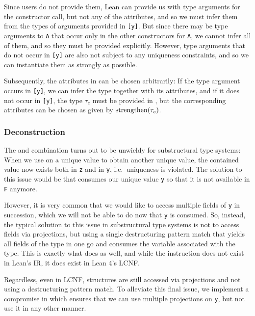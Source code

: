 Since users do not provide them, Lean can provide us with type arguments \icode{[κ]} for the constructor call, but not any of the attributes, and so we must infer them from the types of arguments provided in \texttt{[y]}. But since there may be type arguments to \texttt{A} that occur only in the other constructors for \texttt{A}, we cannot infer all of them, and so they must be provided explicitly. However, type arguments that do not occur in \texttt{[y]} are also not subject to any uniqueness constraints, and so we can instantiate them as strongly as possible. 

Subsequently, the attributes in \icode{[τ?]} can be chosen arbitrarily: If the type argument occurs in \texttt{[y]}, we can infer the type together with its attributes, and if it does not occur in \texttt{[y]}, the type $\tau_e$ must be provided in \icode{[τ?]}, but the corresponding attributes can be chosen as given by $\mathrm{strengthen}(\tau_e)$.

\subsubsection{Deconstruction}
The  and  combination turns out to be unwieldy for substructural type systems: When we use  on a unique value to obtain another unique value, the contained value now exists both in \texttt{z} and in \texttt{y}, i.e.\ uniqueness is violated. The solution to this issue would be that  consumes our unique value \texttt{y} so that it is not available in \texttt{F} anymore. 

However, it is very common that we would like to access multiple fields of \texttt{y} in succession, which we will not be able to do now that \texttt{y} is consumed. So, instead, the typical solution to this issue in substructural type systems is not to access fields via projections, but using a single destructuring pattern match that yields all fields of the type in one go and consumes the variable associated with the type. This is exactly what  does as well, and while the instruction does not exist in Lean's IR, it does exist in Lean 4's LCNF. 

Regardless, even in LCNF, structures are still accessed via projections and not using a destructuring pattern match. To alleviate this final issue, we implement a compromise in  which ensures that we can use multiple projections on \texttt{y}, but not use it in any other manner.

